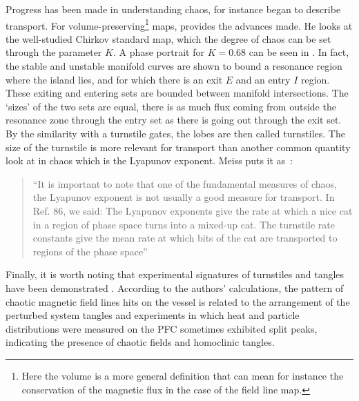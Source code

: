 Progress has been made in understanding chaos, for instance  \cite{easton_transport_1991} began to describe transport. For volume-preserving\footnote{Here the volume is a more general definition that can mean for instance the conservation of the magnetic flux in the case of the field line map.} maps, \cite{meiss_thirty_2015} provides the advances made. He looks at the well-studied Chirkov standard map, which the degree of chaos can be set through the parameter $K$. A phase portrait for $K=0.68$ can be seen in . In fact, the stable and unstable manifold curves are shown to bound a resonance region where the island lies, and for which there is an exit $E$ and an entry $I$ region. These exiting and entering sets are bounded between manifold intersections. The `sizes' of the two sets are equal, there is as much flux coming from outside the resonance zone through the entry set as there is going out through the exit set. By the similarity with a turnstile gates, the lobes are then called turnstiles. The size of the turnstile is more relevant for transport than another common quantity look at in chaos which is the Lyapunov exponent. Meiss puts it as~:
\begin{quote}
``It is important to note that one of the fundamental measures of chaos, the Lyapunov exponent is not usually a good measure for transport. In Ref. 86, we said: The Lyapunov exponents give the rate at which a nice cat in a region of phase space turns into a mixed-up cat. The turnstile rate constants give the mean rate at which bits of the cat are transported to regions of the phase space''
\end{quote}

Finally, it is worth noting that experimental signatures of turnstiles and tangles have been demonstrated \cite{evans_experimental_2005}. According to the authors' calculations, the pattern of chaotic magnetic field lines hits on the vessel is related to the arrangement of the perturbed system tangles and experiments in which heat and particle distributions were measured on the PFC sometimes exhibited split peaks, indicating the presence of chaotic fields and homoclinic tangles. 


